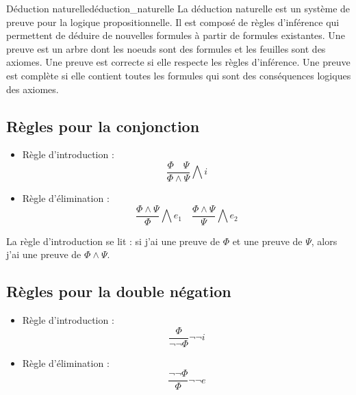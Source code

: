 \begin{definition}{Déduction naturelle}{déduction_naturelle}
    La déduction naturelle est un système de preuve pour la logique propositionnelle. Il est composé de règles d'inférence qui permettent de déduire de nouvelles formules à partir de formules existantes. Une preuve est un arbre dont les noeuds sont des formules et les feuilles sont des axiomes. Une preuve est correcte si elle respecte les règles d'inférence. Une preuve est complète si elle contient toutes les formules qui sont des conséquences logiques des axiomes.
\end{definition}
\subsection{Règles pour la conjonction}
\begin{itemize}[label=$\bullet$]
\item Règle d'introduction :
\begin{equation*}
    \frac{\Phi\quad\Psi}{\Phi\land\Psi}\bigwedge i
\end{equation*}
\item Règle d'élimination :
\begin{equation*}
    \frac{\Phi\land\Psi}{\Phi}\bigwedge e_1\quad\frac{\Phi\land\Psi}{\Psi}\bigwedge e_2
\end{equation*}
\end{itemize}
\begin{example}
La règle d'introduction se lit : si j'ai une preuve de $\Phi$ et une preuve de $\Psi$, alors j'ai une preuve de $\Phi\land\Psi$.
\end{example}

\subsection{Règles pour la double négation}
\begin{itemize}[label=$\bullet$]
\item Règle d'introduction :
\begin{equation*}
    \frac{\Phi}{\neg\neg\Phi}\neg\neg i
\end{equation*}
\item Règle d'élimination :
\begin{equation*}
    \frac{\neg\neg\Phi}{\Phi}\neg\neg e
\end{equation*}
\end{itemize}


